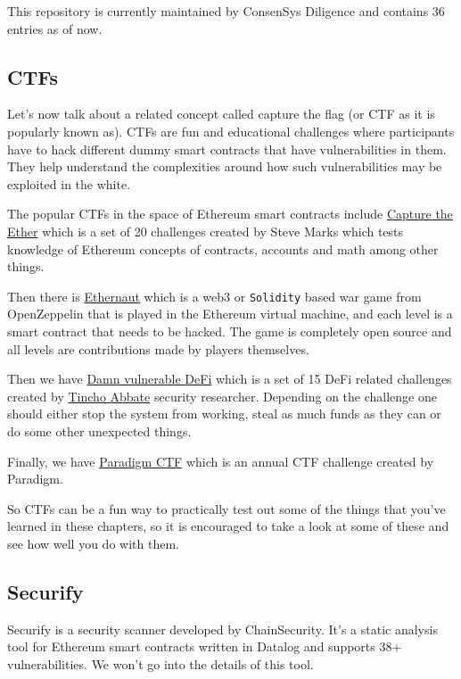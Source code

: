 This repository is currently maintained by ConsenSys Diligence and
contains 36 entries as of now.

\subsection{CTFs}\label{ctfs}

Let's now talk about a related concept called capture the flag (or CTF
as it is popularly known as). CTFs are fun and educational challenges
where participants have to hack different dummy smart contracts that
have vulnerabilities in them. They help understand the complexities
around how such vulnerabilities may be exploited in the white.

The popular CTFs in the space of Ethereum smart contracts include
\href{https://capturetheether.com/}{Capture the Ether} which is a set of
20 challenges created by Steve Marks which tests knowledge of Ethereum
concepts of contracts, accounts and math among other things.

Then there is \href{https://ethernaut.openzeppelin.com/}{Ethernaut}
which is a web3 or \texttt{Solidity} based war game from OpenZeppelin
that is played in the Ethereum virtual machine, and each level is a
smart contract that needs to be hacked. The game is completely open
source and all levels are contributions made by players themselves.

Then we have \href{https://www.damnvulnerabledefi.xyz/}{Damn vulnerable
DeFi} which is a set of 15 DeFi related challenges created by
\href{https://twitter.com/tinchoabbate}{Tincho Abbate} security
researcher. Depending on the challenge one should either stop the system
from working, steal as much funds as they can or do some other
unexpected things.

Finally, we have
\href{https://twitter.com/paradigm_ctf?lang=es}{Paradigm CTF} which is
an annual CTF challenge created by Paradigm.

So CTFs can be a fun way to practically test out some of the things that
you've learned in these chapters, so it is encouraged to take a look at
some of these and see how well you do with them.

\subsection{Securify}\label{securify}

Securify is a security scanner developed by ChainSecurity. It's a static
analysis tool for Ethereum smart contracts written in Datalog and
supports 38+ vulnerabilities. We won't go into the details of this tool.

